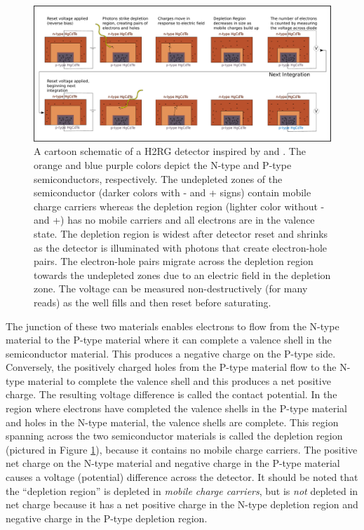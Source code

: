 \documentclass{aastex62}
\begin{document}
\begin{figure}[!hbtp]
\centering
\includegraphics[width=.99\columnwidth]{ideal_photodiode.pdf}
\caption{A cartoon schematic of a H2RG detector inspired by \citet{smith2008imgPersistence} and \citet{tulloch2018persistenceH2RG}.
The orange and blue purple colors depict the N-type and P-type semiconductors, respectively.
The undepleted zones of the semiconductor (darker colors with - and + signs) contain mobile charge carriers whereas the depletion region (lighter color without - and +) has no mobile carriers and all electrons are in the valence state.
The depletion region is widest after detector reset and shrinks as the detector is illuminated with photons that create electron-hole pairs.
The electron-hole pairs migrate across the depletion region towards the undepleted zones due to an electric field in the depletion zone.
The voltage can be measured non-destructively (for many reads) as the well fills and then reset before saturating.}\label{fig:npSchematic}
\end{figure}



The junction of these two materials enables electrons to flow from the N-type material to the P-type material where it can complete a valence shell in the semiconductor material.
This produces a negative charge on the P-type side.
Conversely, the positively charged holes from the P-type material flow to the N-type material to complete the valence shell and this produces a net positive charge.
The resulting voltage difference is called the contact potential.
In the region where electrons have completed the valence shells in the P-type material and holes in the N-type material, the valence shells are complete.
This region spanning across the two semiconductor materials is called the depletion region (pictured in Figure \ref{fig:npSchematic}), because it contains no mobile charge carriers.
The positive net charge on the N-type material and negative charge in the P-type material causes a voltage (potential) difference across the detector.
It should be noted that the ``depletion region'' is depleted in {\it mobile charge carriers}, but is {\it not} depleted in net charge because it has a net positive charge in the N-type depletion region and negative charge in the P-type depletion region.
\end{document}
